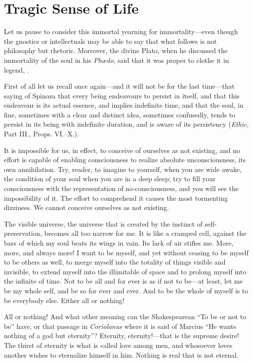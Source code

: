 
\author{Miguel de Unamuno}
\chapter[Tragic Sense of Life, chap. 3]{Tragic Sense of Life}

\noindent Let us pause to consider this immortal yearning for
immortality---even though the gnostics or intellectuals may be able to
say that what follows is not philosophy but rhetoric. Moreover, the
divine Plato, when he discussed the immortality of the soul in his
\textit{Ph\ae do}, said that it was proper to clothe it in legend,
.

First of all let us recall once again---and it will not be for the
last time---that saying of Spinoza that every being endeavours to
persist in itself, and that this endeavour is its actual essence, and
implies indefinite time, and that the soul, in fine, sometimes with a
clear and distinct idea, sometimes confusedly, tends to persist in its
being with indefinite duration, and is aware of its persistency
(\textit{Ethic}, Part III., Props. VI.--X.).

It is impossible for us, in effect, to conceive of ourselves as not
existing, and no effort is capable of enabling consciousness to
realize absolute unconsciousness, its own annihilation. Try, reader,
to imagine to yourself, when you are wide awake, the condition of your
soul when you are in a deep sleep; try to fill your consciousness with
the representation of no-consciousness, and you will see the
impossibility of it. The effort to comprehend it causes the most
tormenting dizziness. We cannot conceive ourselves as not existing.

The visible universe, the universe that is created by the instinct of
self-pre\-ser\-va\-tion, becomes all too narrow for me. It is like a
cramped cell, against the bars of which my soul beats its wings in
vain. Its lack of air stifles me. More, more, and always more! I want
to be myself, and yet without ceasing to be myself to be others
 as well, to merge myself into the totality of things visible
and invisible, to extend myself into the illimitable of space and to
prolong myself into the infinite of time. Not to be all and for ever
is as if not to be---at least, let me be my whole self, and be so for
ever and ever. And to be the whole of myself is to be everybody else.
Either all or nothing!

All or nothing! And what other meaning can the Shakespearean ``To be
or not to be'' have, or that passage in \textit{Coriolanus} where it
is said of Marcius ``He wants nothing of a god but eternity''?
Eternity, eternity!---that is the supreme desire! The thirst of
eternity is what is called love among men, and whosoever loves another
wishes to eternalize himself in him. Nothing is real that is not
eternal.

